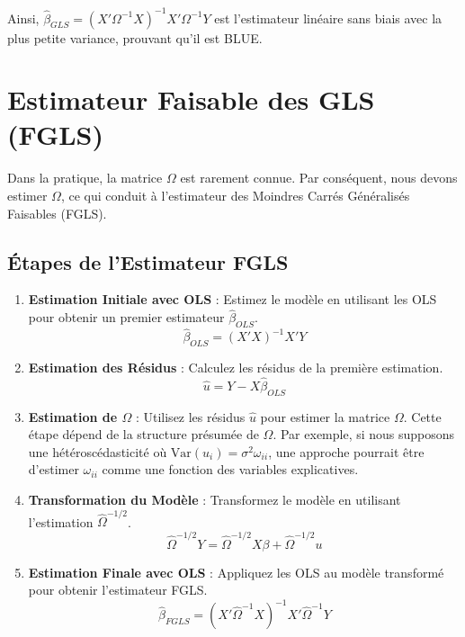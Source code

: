 \documentclass[14pt]{extarticle} %
\theoremstyle{definition}
\theoremstyle{plain}
\begin{document}
Ainsi, \(\hat{\beta}_{GLS} = (X' \Omega^{-1} X)^{-1} X' \Omega^{-1} Y\) est l'estimateur linéaire sans biais avec la plus petite variance, prouvant qu'il est BLUE.

\section{Estimateur Faisable des GLS (FGLS)}

Dans la pratique, la matrice \( \Omega \) est rarement connue. Par conséquent, nous devons estimer \( \Omega \), ce qui conduit à l'estimateur des Moindres Carrés Généralisés Faisables (FGLS).

\subsection{Étapes de l'Estimateur FGLS}

\begin{enumerate}
    \item \textbf{Estimation Initiale avec OLS} : Estimez le modèle en utilisant les OLS pour obtenir un premier estimateur \(\hat{\beta}_{OLS}\).
    \[
    \hat{\beta}_{OLS} = (X'X)^{-1} X' Y
    \]
    
    \item \textbf{Estimation des Résidus} : Calculez les résidus de la première estimation.
    \[
    \hat{u} = Y - X \hat{\beta}_{OLS}
    \]
    
    \item \textbf{Estimation de \( \Omega \)} : Utilisez les résidus \(\hat{u}\) pour estimer la matrice \( \Omega \). Cette étape dépend de la structure présumée de \( \Omega \). Par exemple, si nous supposons une hétéroscédasticité où \( \text{Var}(u_i) = \sigma^2 \omega_{ii} \), une approche pourrait être d'estimer \(\omega_{ii}\) comme une fonction des variables explicatives.
    
    \item \textbf{Transformation du Modèle} : Transformez le modèle en utilisant l'estimation \(\hat{\Omega}^{-1/2}\).
    \[
    \hat{\Omega}^{-1/2} Y = \hat{\Omega}^{-1/2} X \beta + \hat{\Omega}^{-1/2} u
    \]
    
    \item \textbf{Estimation Finale avec OLS} : Appliquez les OLS au modèle transformé pour obtenir l'estimateur FGLS.
    \[
    \hat{\beta}_{FGLS} = (X' \hat{\Omega}^{-1} X)^{-1} X' \hat{\Omega}^{-1} Y
    \]
\end{enumerate}
\end{document}
